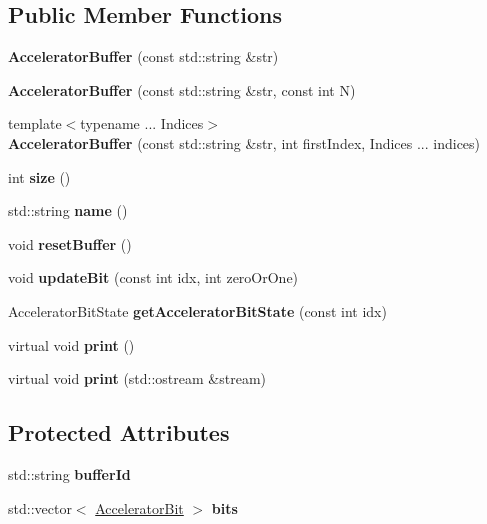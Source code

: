 \subsection*{Public Member Functions}
\begin{DoxyCompactItemize}
\item 
\mbox{\label{a02444_a5115079c3f3f8d32e713f78a91c93a7a}} 
{\bfseries Accelerator\+Buffer} (const std\+::string \&str)
\item 
\mbox{\label{a02444_a6947082735241791c5170d677042da4a}} 
{\bfseries Accelerator\+Buffer} (const std\+::string \&str, const int N)
\item 
\mbox{\label{a02444_a96020c3470a86111ae73bdc79ff73237}} 
{\footnotesize template$<$typename ... Indices$>$ }\\{\bfseries Accelerator\+Buffer} (const std\+::string \&str, int first\+Index, Indices ... indices)
\item 
\mbox{\label{a02444_a249eae9f3b83072e5b101ba23f900e81}} 
int {\bfseries size} ()
\item 
\mbox{\label{a02444_a3373218e4d430d061ba75135bf14ede3}} 
std\+::string {\bfseries name} ()
\item 
\mbox{\label{a02444_aa5080c9a975871858b39d3394e867e77}} 
void {\bfseries reset\+Buffer} ()
\item 
\mbox{\label{a02444_a689855524e630049db6120a1493a3c45}} 
void {\bfseries update\+Bit} (const int idx, int zero\+Or\+One)
\item 
\mbox{\label{a02444_a29ece4f7b671308b89c06f3ac8e74b9e}} 
Accelerator\+Bit\+State {\bfseries get\+Accelerator\+Bit\+State} (const int idx)
\item 
\mbox{\label{a02444_a3776733a3196bca276988d4cc50a135a}} 
virtual void {\bfseries print} ()
\item 
\mbox{\label{a02444_a6f2cf905960a528fc829904a3c176c6e}} 
virtual void {\bfseries print} (std\+::ostream \&stream)
\end{DoxyCompactItemize}
\subsection*{Protected Attributes}
\begin{DoxyCompactItemize}
\item 
\mbox{\label{a02444_adca17dc5025c067a927aefd6a5cbe51b}} 
std\+::string {\bfseries buffer\+Id}
\item 
\mbox{\label{a02444_a36b3300cbada4e54e9e68d1c7c135c9b}} 
std\+::vector$<$ \hyperlink{a02440}{Accelerator\+Bit} $>$ {\bfseries bits}
\end{DoxyCompactItemize}


